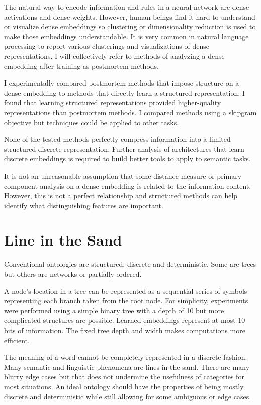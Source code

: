 \documentclass[sigconf]{acmart}
\begin{document}
The natural way to encode information and rules in a neural network are dense activations and dense weights. However, human beings find it hard to understand or visualize dense embeddings so clustering or dimensionality reduction is used to make those embeddings understandable. It is very common in natural language processing to report various clusterings and visualizations of dense representations. I will collectively refer to methods of analyzing a dense embedding after training as postmortem methods.

I experimentally compared postmortem methods that impose structure on a dense embedding to methods that directly learn a structured representation. I found that learning structured representations provided higher-quality representations than postmortem methods. I compared methods using a skipgram objective but techniques could be applied to other tasks.

None of the tested methods perfectly compress information into a limited structured discrete representation. Further analysis of architectures that learn discrete embeddings is required to build better tools to apply to semantic tasks.

It is not an unreasonable assumption that some distance measure or primary component analysis on a dense embedding is related to the information content. However, this is not a perfect relationship and structured methods can help identify what distinguishing features are important.

\section{Line in the Sand}

Conventional ontologies are  structured, discrete and deterministic. Some are trees but others are networks or partially-ordered.

A node's location in a tree can be represented as a sequential series of symbols representing each branch taken from the root node. For simplicity, experiments were performed using a simple binary tree with a depth of 10 but more complicated structures are possible. Learned embeddings represent at most 10 bits of information. The fixed tree depth and width makes computations more efficient.

The meaning of a word cannot be completely represented in a discrete fashion. Many semantic and linguistic phenomena are lines in the sand. There are many blurry edge cases but that does not undermine the usefulness of categories for most situations. An ideal ontology should have the properties of being mostly discrete and deterministic while still allowing for some ambiguous or edge cases.
\end{document}
